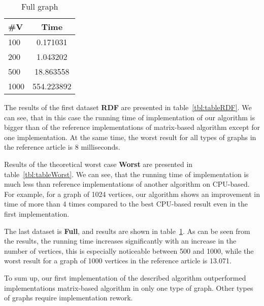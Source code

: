 \hfill
\begin{minipage}[t]{27mm}

\begin{table}[H]
\centering
\caption{Full graph}
\label{tbl:tableFull}
\begin{tabular}{| l | | c |}
    \hline
    \#V                & Time        \\
    \hline
    \hline
    100                 & 0.171031   \\
    200                 & 1.043202   \\
    500                 & 18.863558  \\
    1000                & 554.223892 \\
    \hline
  \end{tabular}
\end{table}

\end{minipage}

The results of the first dataset \textbf{RDF} are presented in table~\ref{tbl:tableRDF}. We can see, that in this case the running time of implementation of our algorithm is bigger than of the reference implementations of matrix-based algorithm except for one implementation. At the same time, the worst result for all types of graphs in the reference article is 8 milliseconds.

Results of the theoretical worst case \textbf{Worst} are presented in table~\ref{tbl:tableWorst}. We can see, that the running time of implementation is much less than reference implementations of another algorithm on CPU-based. For example, for a graph of 1024 vertices, our algorithm shows an improvement in time of more than 4 times compared to the best CPU-based result even in the first implementation.

The last dataset is \textbf{Full}, and results are shown in table~\ref{tbl:tableFull}. As can be seen from the results, the running time increases significantly with an increase in the number of vertices, this is especially noticeable between 500 and 1000, while the worst result for a graph of 1000 vertices in the reference article is 13.071.

To sum up, our first implementation of the described algorithm outperformed implementations matrix-based algorithm in only one type of graph. Other types of graphs require implementation rework.
